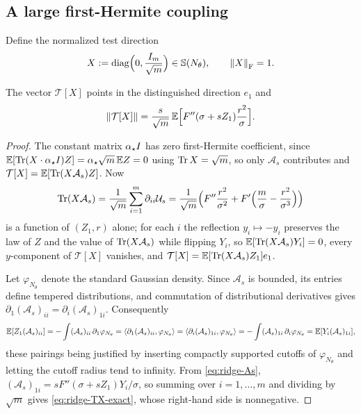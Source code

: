 \subsection{A large first-Hermite coupling}

Define the normalized test direction
\begin{equation}
\label{eq:ridge-X}
    X:=\operatorname{diag}\Bigl(0,\frac{I_m}{\sqrt m}\Bigr)\in\mathbb{S}(N_\theta),
    \qquad\left\lVert X\right\rVert_{\mathrm{F}}=1 .
\end{equation}

\begin{lemma}
\label{lem:ridge-codazzi}
The vector $\mathcal T[X]$ points in the distinguished direction $e_1$ and
\begin{equation}
\label{eq:ridge-TX-exact}
    \left\lVert \mathcal T[X]\right\rVert=\frac s{\sqrt m}\,\mathbb{E}\Bigl[F''(\sigma+sZ_1)\frac{r^2}\sigma\Bigr].
\end{equation}
\end{lemma}

\begin{proof}
The constant matrix $\alpha_\star I$ has zero first-Hermite coefficient, since
$\mathbb{E}[\operatorname{Tr}(X\cdot\alpha_\star I)Z]=\alpha_\star\sqrt m\,\mathbb{E} Z=0$ using $\operatorname{Tr} X=\sqrt m$, so only
$\mathcal A_s$ contributes and $\mathcal T[X]=\mathbb{E}[\operatorname{Tr}(X\mathcal A_s)Z]$. Now
\[
    \operatorname{Tr}(X\mathcal A_s)
    =\frac1{\sqrt m}\sum_{i=1}^m\partial_{ii}\mathcal U_s
    =\frac1{\sqrt m}\Bigl(F''\frac{r^2}{\sigma^2}+F'\Bigl(\frac m\sigma-\frac{r^2}{\sigma^3}\Bigr)\Bigr)
\]
is a function of $(Z_1,r)$ alone; for each $i$ the reflection $y_i\mapsto-y_i$ preserves the law
of $Z$ and the value of $\operatorname{Tr}(X\mathcal A_s)$ while flipping $Y_i$, so
$\mathbb{E}[\operatorname{Tr}(X\mathcal A_s)Y_i]=0$, every $y$-component of $\mathcal T[X]$ vanishes, and
$\mathcal T[X]=\mathbb{E}[\operatorname{Tr}(X\mathcal A_s)Z_1]e_1$.

Let $\varphi_{N_\theta}$ denote the standard Gaussian density. Since $\mathcal A_s$ is bounded,
its entries define tempered distributions, and commutation of distributional derivatives gives
$\partial_1(\mathcal A_s)_{ii}=\partial_i(\mathcal A_s)_{1i}$. Consequently
\[
    \mathbb{E}[Z_1(\mathcal A_s)_{ii}]
    =-\int(\mathcal A_s)_{ii}\,\partial_1\varphi_{N_\theta}
    =\left\langle \partial_1(\mathcal A_s)_{ii},\varphi_{N_\theta}\right\rangle
    =\left\langle \partial_i(\mathcal A_s)_{1i},\varphi_{N_\theta}\right\rangle
    =-\int(\mathcal A_s)_{1i}\,\partial_i\varphi_{N_\theta}
    =\mathbb{E}[Y_i(\mathcal A_s)_{1i}],
\]
these pairings being justified by inserting compactly supported cutoffs of
$\varphi_{N_\theta}$ and letting the cutoff radius tend to infinity. From
\eqref{eq:ridge-As}, $(\mathcal A_s)_{1i}=sF''(\sigma+sZ_1)Y_i/\sigma$, so summing over
$i=1,\dots,m$ and dividing by $\sqrt m$ gives \eqref{eq:ridge-TX-exact}, whose right-hand side
is nonnegative.
\end{proof}

